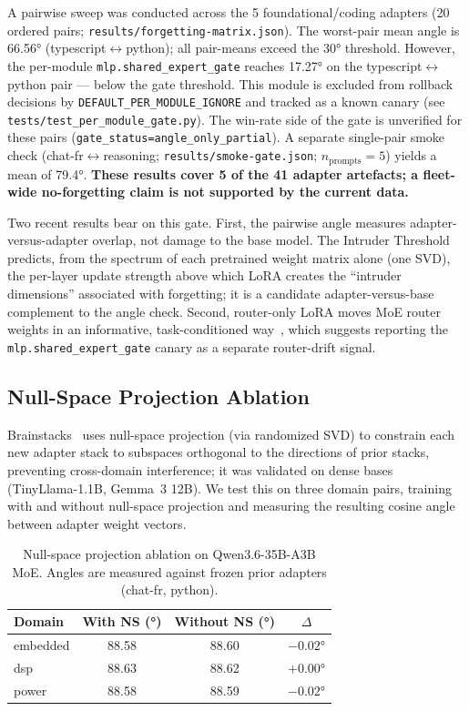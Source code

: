 \documentclass[11pt,a4paper]{article}
\begin{document}
A pairwise sweep was conducted across the 5 foundational/coding adapters (20 ordered pairs; \texttt{results/forgetting-matrix.json}). The worst-pair mean angle is 66.56° (typescript$\leftrightarrow$python); all pair-means exceed the 30° threshold. However, the per-module \texttt{mlp.shared\_expert\_gate} reaches 17.27° on the typescript$\leftrightarrow$python pair --- below the gate threshold. This module is excluded from rollback decisions by \texttt{DEFAULT\_PER\_MODULE\_IGNORE} and tracked as a known canary (see \texttt{tests/test\_per\_module\_gate.py}). The win-rate side of the gate is unverified for these pairs (\texttt{gate\_status=angle\_only\_partial}). A separate single-pair smoke check (chat-fr$\leftrightarrow$reasoning; \texttt{results/smoke-gate.json}; $n_\text{prompts}{=}5$) yields a mean of 79.4°. \textbf{These results cover 5 of the 41 adapter artefacts; a fleet-wide no-forgetting claim is not supported by the current data.}

Two recent results bear on this gate. First, the pairwise angle measures adapter-versus-adapter overlap, not damage to the base model. The Intruder Threshold~\citep{xie2026intruder} predicts, from the spectrum of each pretrained weight matrix alone (one SVD), the per-layer update strength above which LoRA creates the ``intruder dimensions'' associated with forgetting; it is a candidate adapter-versus-base complement to the angle check. Second, router-only LoRA moves MoE router weights in an informative, task-conditioned way~\citep{janati2026routersensitivity}, which suggests reporting the \texttt{mlp.shared\_expert\_gate} canary as a separate router-drift signal.

\subsection{Null-Space Projection Ablation}

Brainstacks~\citep{abuayyash2026brainstacks} uses null-space projection (via randomized SVD) to constrain each new adapter stack to subspaces orthogonal to the directions of prior stacks, preventing cross-domain interference; it was validated on dense bases (TinyLlama-1.1B, Gemma~3 12B). We test this on three domain pairs, training with and without null-space projection and measuring the resulting cosine angle between adapter weight vectors.

\begin{table}[h]
\centering
\caption{Null-space projection ablation on Qwen3.6-35B-A3B MoE. Angles are measured against frozen prior adapters (chat-fr, python).}
\label{tab:nullspace}
\begin{tabular}{lccc}
\toprule
\textbf{Domain} & \textbf{With NS (°)} & \textbf{Without NS (°)} & \textbf{$\Delta$} \\
\midrule
embedded & 88.58 & 88.60 & $-0.02$° \\
dsp & 88.63 & 88.62 & $+0.00$° \\
power & 88.58 & 88.59 & $-0.02$° \\
\bottomrule
\end{tabular}
\end{table}
\end{document}

